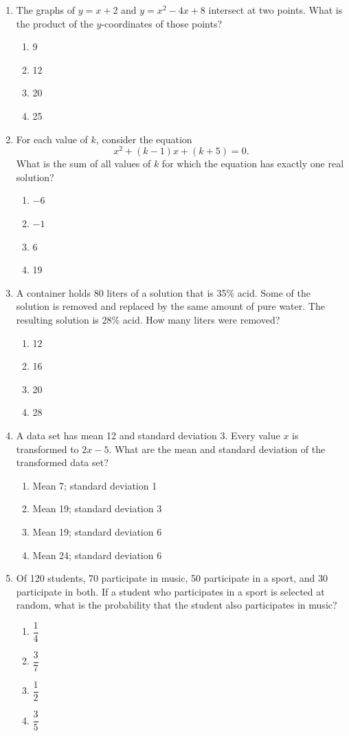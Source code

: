 \documentclass[12pt]{article}
\begin{document}
\begin{enumerate}[leftmargin=*,itemsep=1.15em]
  \item The graphs of $y=x+2$ and $y=x^2-4x+8$ intersect at two points. What is the product of the $y$-coordinates of those points?
  \begin{enumerate}[label=\Alph*.,itemsep=0pt]
    \item 9 \item 12 \item 20 \item 25
  \end{enumerate}

  \item For each value of $k$, consider the equation
  \[
    x^2+(k-1)x+(k+5)=0.
  \]
  What is the sum of all values of $k$ for which the equation has exactly one real solution?
  \begin{enumerate}[label=\Alph*.,itemsep=0pt]
    \item $-6$ \item $-1$ \item 6 \item 19
  \end{enumerate}

  \item A container holds 80 liters of a solution that is 35\% acid. Some of the solution is removed and replaced by the same amount of pure water. The resulting solution is 28\% acid. How many liters were removed?
  \begin{enumerate}[label=\Alph*.,itemsep=0pt]
    \item 12 \item 16 \item 20 \item 28
  \end{enumerate}

  \item A data set has mean 12 and standard deviation 3. Every value $x$ is transformed to $2x-5$. What are the mean and standard deviation of the transformed data set?
  \begin{enumerate}[label=\Alph*.,itemsep=0pt]
    \item Mean 7; standard deviation 1
    \item Mean 19; standard deviation 3
    \item Mean 19; standard deviation 6
    \item Mean 24; standard deviation 6
  \end{enumerate}

  \item Of 120 students, 70 participate in music, 50 participate in a sport, and 30 participate in both. If a student who participates in a sport is selected at random, what is the probability that the student also participates in music?
  \begin{enumerate}[label=\Alph*.,itemsep=0pt]
    \item $\dfrac14$ \item $\dfrac37$ \item $\dfrac12$ \item $\dfrac35$
  \end{enumerate}


\end{enumerate}
\end{document}
